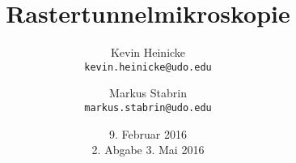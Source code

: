 


\title{%
    Rastertunnelmikroskopie
}
\author{%
    Kevin Heinicke\\
    \texttt{kevin.heinicke@udo.edu}
    \and
    Markus Stabrin\\
    \texttt{markus.stabrin@udo.edu}
}
\date{%
    9. Februar 2016\\
    {\small 2. Abgabe} 3. Mai 2016\\
}

    \maketitle%
    \tableofcontents
    \newpage
    
    

    \printbibliography

